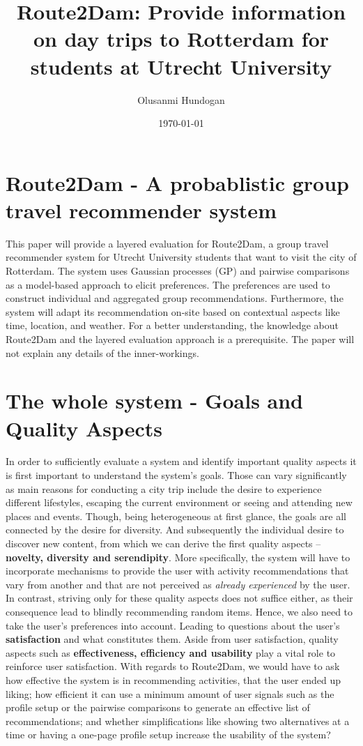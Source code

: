 \documentclass[11pt,a4paper,oneside]{article}
\title{\textbf{Route2Dam: Provide information on day trips to Rotterdam for students at Utrecht University}}
\date{\today}
\author{Olusanmi Hundogan}
\begin{document}
\maketitle

\section{Route2Dam - A probablistic group travel recommender system}
This paper will provide a layered evaluation for Route2Dam, a group travel recommender system for Utrecht University students that want to visit the city of Rotterdam. The system uses Gaussian processes (GP) and pairwise comparisons as a model-based approach to elicit preferences. The preferences are used to construct individual and aggregated group recommendations. Furthermore, the system will adapt its recommendation on-site based on contextual aspects like time, location, and weather. For a better understanding, the knowledge about Route2Dam and the layered evaluation approach is a prerequisite. The paper will not explain any details of the inner-workings.

\section{The whole system - Goals and Quality Aspects}
In order to sufficiently evaluate a system and identify important quality aspects it is first important to understand the system's goals. Those can vary significantly as main reasons for conducting a city trip include the desire to experience different lifestyles, escaping the current environment or seeing and attending new places and events.\cite{rita2019millennials} Though, being heterogeneous at first glance, the goals are all connected by the desire for diversity. And subsequently the individual desire to discover new content, from which we can derive the first quality aspects -- \textbf{novelty, diversity and serendipity}. More specifically, the system will have to incorporate mechanisms to provide the user with activity recommendations that vary from another and that are not perceived as \emph{already experienced} by the user. In contrast, striving only for these quality aspects does not suffice either, as their consequence lead to blindly recommending random items. Hence, we also need to take the user's preferences into account. Leading to questions about the user's \textbf{satisfaction} and what constitutes them. Aside from user satisfaction, quality aspects such as \textbf{effectiveness, efficiency and usability} play a vital role to reinforce user satisfaction.\cite{CITE} With regards to Route2Dam, we would have to ask how effective the system is in recommending activities, that the user ended up liking; how efficient it can use a minimum amount of user signals such as the profile setup or the pairwise comparisons to generate an effective list of recommendations; and whether simplifications like showing two alternatives at a time or having a one-page profile setup increase the usability of the system? 
\end{document}
